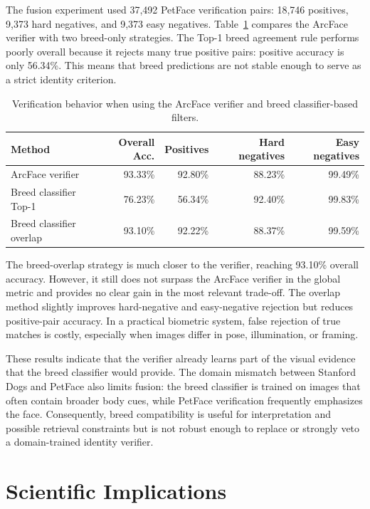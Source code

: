 \documentclass[conference]{IEEEtran}
\begin{document}
The fusion experiment used 37,492 PetFace verification pairs: 18,746 positives, 9,373 hard negatives, and 9,373 easy negatives. Table~\ref{tab:fusion_results} compares the ArcFace verifier with two breed-only strategies. The Top-1 breed agreement rule performs poorly overall because it rejects many true positive pairs: positive accuracy is only 56.34\%. This means that breed predictions are not stable enough to serve as a strict identity criterion.

\begin{table}[t]
\centering
\caption{Verification behavior when using the ArcFace verifier and breed classifier-based filters.}
\label{tab:fusion_results}
\begin{tabular}{lrrrr}
\toprule
Method & Overall Acc. & Positives & Hard negatives & Easy negatives \\
\midrule
ArcFace verifier & 93.33\% & 92.80\% & 88.23\% & 99.49\% \\
Breed classifier Top-1 & 76.23\% & 56.34\% & 92.40\% & 99.83\% \\
Breed classifier overlap & 93.10\% & 92.22\% & 88.37\% & 99.59\% \\
\bottomrule
\end{tabular}
\end{table}

The breed-overlap strategy is much closer to the verifier, reaching 93.10\% overall accuracy. However, it still does not surpass the ArcFace verifier in the global metric and provides no clear gain in the most relevant trade-off. The overlap method slightly improves hard-negative and easy-negative rejection but reduces positive-pair accuracy. In a practical biometric system, false rejection of true matches is costly, especially when images differ in pose, illumination, or framing.

These results indicate that the verifier already learns part of the visual evidence that the breed classifier would provide. The domain mismatch between Stanford Dogs and PetFace also limits fusion: the breed classifier is trained on images that often contain broader body cues, while PetFace verification frequently emphasizes the face. Consequently, breed compatibility is useful for interpretation and possible retrieval constraints but is not robust enough to replace or strongly veto a domain-trained identity verifier.

\section{Scientific Implications}
\end{document}
